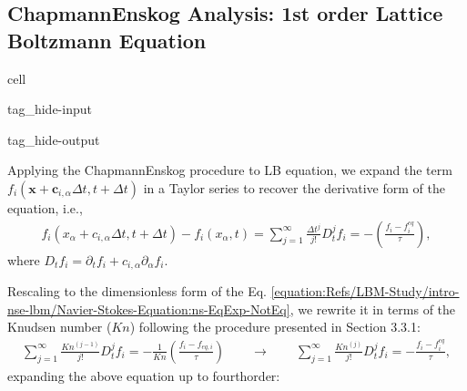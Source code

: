 \documentclass[letterpaper,10pt,english,openany,oneside]{jupyterBook}
\begin{document}
\subsection{Chapmann\sphinxhyphen{}Enskog Analysis: 1st order Lattice Boltzmann Equation}
\label{\detokenize{Refs/LBM-Study/intro-nse-lbm/Navier-Stokes-Equation:chapmann-enskog-analysis-1st-order-lattice-boltzmann-equation}}
\begin{sphinxuseclass}{cell}
\begin{sphinxuseclass}{tag_hide-input}
\begin{sphinxuseclass}{tag_hide-output}
\end{sphinxuseclass}
\end{sphinxuseclass}
\end{sphinxuseclass}
\sphinxAtStartPar
Applying the Chapmann\sphinxhyphen{}Enskog procedure to LB equation, we expand the term \(f_{i}\left(\boldsymbol{x}+\boldsymbol{c}_{i,\alpha} \Delta t, t+\Delta t\right)\) in a Taylor series to recover the derivative form of the equation, i.e.,
\begin{equation}\label{equation:Refs/LBM-Study/intro-nse-lbm/Navier-Stokes-Equation:ns-EqExp-NotEq}
\begin{split}
f_{i}\left( x_{\alpha} + c_{i,\alpha} \Delta t, t+\Delta t\right)- f_{i}(x_{\alpha}, t)=\displaystyle\sum_{j=1}^{\infty}\frac{\Delta t^{j}}{j!}D_{t}^{j}f_{i}= -\left( \frac{ f_{i} - f_{i}^{eq} }{ \tau } \right),
\end{split}
\end{equation}
\sphinxAtStartPar
where \(D_{t}f_{i}=\partial_{t}f_{i} + c_{i,\alpha}\partial_{\alpha} f_{i}\).

\sphinxAtStartPar
Rescaling to the dimensionless form of the Eq. \eqref{equation:Refs/LBM-Study/intro-nse-lbm/Navier-Stokes-Equation:ns-EqExp-NotEq}, we rewrite it in terms of the Knudsen number (\(Kn\)) following the procedure presented in  Section 3.3.1:
\begin{equation*}
\begin{split}
\displaystyle \sum^{\infty}_{j=1}  \frac{Kn^{(j-1)}}{j!} D_{t}^{j} f_{i} = - \frac{1}{Kn}\left( \frac{ f_{i} - f_{eq,i} }{ \tau } \right) \quad \quad \rightarrow \quad \quad \displaystyle \sum^{\infty}_{j=1}  \frac{Kn^{(j)}}{j!} D_{t}^{j} f_{i} = -  \frac{ f_{i} - f_{i}^{eq} }{ \tau },
\end{split}
\end{equation*}
\sphinxAtStartPar
expanding the above equation up to fourth\sphinxhyphen{}order:
\end{document}
